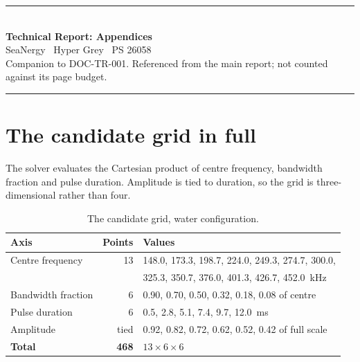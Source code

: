 \documentclass[11pt,a4paper]{article}
\begin{document}
\begin{center}
{\color{ocean}\rule{\linewidth}{1.0pt}}\\[5mm]
{\huge\bfseries Technical Report: Appendices}\\[3mm]
{\large SeaNergy \textbar\ Hyper Grey \textbar\ PS 26058}\\[2mm]
{\footnotesize Companion to DOC-TR-001. Referenced from the main report;
not counted against its page budget.}\\[4mm]
{\color{ocean}\rule{\linewidth}{1.0pt}}
\end{center}

\vspace{4mm}
\tableofcontents
\vspace{6mm}

\section{The candidate grid in full}

The solver evaluates the Cartesian product of centre frequency, bandwidth
fraction and pulse duration. Amplitude is tied to duration, so the grid is
three-dimensional rather than four.

\begin{table}[htbp]
\centering
\small
\begin{tabular}{lrl}
\toprule
\textbf{Axis} & \textbf{Points} & \textbf{Values} \\
\midrule
Centre frequency & 13 & \SI{148.0}{}, \SI{173.3}{}, \SI{198.7}{}, \SI{224.0}{},
  \SI{249.3}{}, \SI{274.7}{}, \SI{300.0}{}, \\
 & & \SI{325.3}{}, \SI{350.7}{}, \SI{376.0}{}, \SI{401.3}{}, \SI{426.7}{},
  \SI{452.0}{\kilo\hertz} \\
Bandwidth fraction & 6 & 0.90, 0.70, 0.50, 0.32, 0.18, 0.08 of centre \\
Pulse duration & 6 & \SI{0.5}{}, \SI{2.8}{}, \SI{5.1}{}, \SI{7.4}{},
  \SI{9.7}{}, \SI{12.0}{\milli\second} \\
Amplitude & tied & 0.92, 0.82, 0.72, 0.62, 0.52, 0.42 of full scale \\
\midrule
\textbf{Total} & \textbf{468} & $13 \times 6 \times 6$ \\
\bottomrule
\end{tabular}
\caption{The candidate grid, water configuration.}
\end{table}
\end{document}
